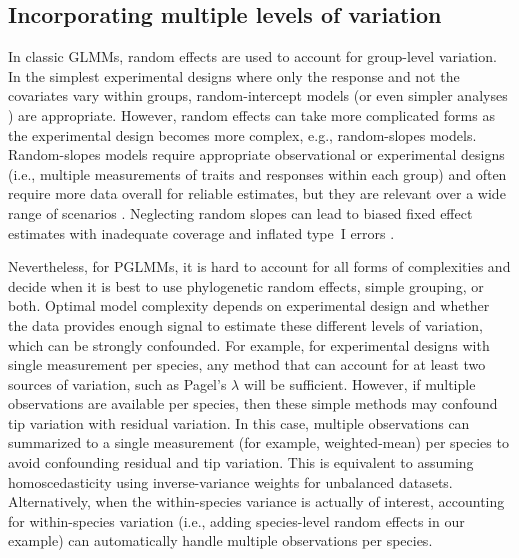 \documentclass[12pt]{article}
\begin{document}
\subsection*{Incorporating multiple levels of variation}


In classic GLMMs, random effects are used to account for group-level variation. 
In the simplest experimental designs where only the response and not the covariates vary
within groups, random-intercept models (or even simpler analyses \cite{murtaugh2007simplicity})
are appropriate.
However, random effects can take more complicated forms as the experimental design becomes more complex, e.g., random-slopes models.
Random-slopes models require appropriate observational or experimental designs (i.e., multiple measurements of traits and responses within each group) and often require more data overall for reliable estimates, but they are relevant over a wide range of scenarios \citep{schielzeth2008conclusions, cleasby2015quantifying,ord2010adaptation}.
Neglecting random slopes can lead to biased fixed effect estimates with inadequate coverage and inflated type~I errors \citep{schielzeth2008conclusions}.

Nevertheless, for PGLMMs, it is hard to account for all forms of complexities and decide when it is best to use phylogenetic random effects, simple grouping, or both. 
Optimal model complexity depends on experimental design and whether the data provides enough signal to estimate these different levels of variation, which can be strongly confounded.
For example, for experimental designs with single measurement per species, any method that can account for at least two sources of variation, such as Pagel's $\lambda$ will be sufficient. 
However, if multiple observations are available per species, then these simple methods may confound tip variation with residual variation.
In this case, multiple observations can summarized to a single measurement (for example, weighted-mean) per species to avoid confounding residual and tip variation.
This is equivalent to assuming homoscedasticity using inverse-variance weights for unbalanced datasets. 
Alternatively, when the within-species variance is actually of interest, accounting for within-species variation (i.e., adding species-level random effects in our example) can automatically handle multiple observations per species.
\end{document}
